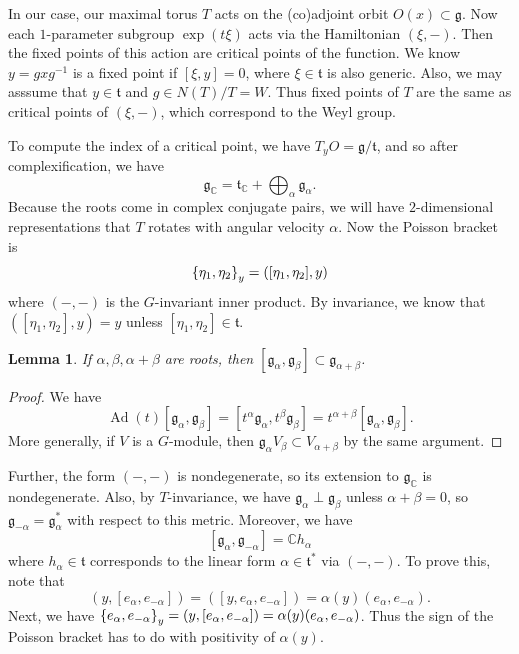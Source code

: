 \documentclass[leqno, openany]{memoir}
\newtheorem{lem}[thm]{Lemma}
\theoremstyle{definition}
\theoremstyle{remark}
\theoremstyle{plain}
\theoremstyle{definition}
\theoremstyle{remark}
\newcommand{\C}{\mathbb{C}}
\newcommand{\mf}[1]{\mathfrak{#1}}
\DeclareMathOperator{\Ad}{Ad}
\begin{document}
In our case, our maximal torus $T$ acts on the (co)adjoint orbit $O(x) \subset \mf{g}$. Now each $1$-parameter subgroup $\exp(t \xi)$ acts via the Hamiltonian $(\xi, -)$. Then the fixed points of this action are critical points of the function. We know $y = g x g^{-1}$ is a fixed point if $[\xi, y] = 0$, where $\xi \in \mf{t}$ is also generic. Also, we may asssume that $y \in \mf{t}$ and $g \in N(T)/T = W$. Thus fixed points of $T$ are the same as critical points of $(\xi, -)$, which correspond to the Weyl group.

To compute the index of a critical point, we have $T_y O = \mf{g} / \mf{t}$, and so after complexification, we have 
\[ \mf{g}_{\C} = \mf{t}_{\C} + \bigoplus_{\alpha} \mf{g}_{\alpha}. \] 
Because the roots come in complex conjugate pairs, we will have $2$-dimensional representations that $T$ rotates with angular velocity $\alpha$. Now the Poisson bracket is
\[ \qty{\eta_1, \eta_2}_y = ([\eta_1, \eta_2], y) \]
where $(-,-)$ is the $G$-invariant inner product. By invariance, we know that $([\eta_1, \eta_2], y) = y$ unless $[\eta_1, \eta_2] \in \mf{t}$.

\begin{lem}
    If $\alpha, \beta, \alpha + \beta$ are roots, then $[\mf{g}_{\alpha}, \mf{g}_{\beta}] \subset \mf{g}_{\alpha + \beta}$.
\end{lem}

\begin{proof}
    We have
    \[ \Ad(t) [\mf{g}_{\alpha}, \mf{g}_{\beta}] = [t^{\alpha }\mf{g}_{\alpha}, t^{\beta} \mf{g}_{\beta}] = t^{\alpha + \beta} [\mf{g}_{\alpha}, \mf{g}_{\beta}]. \]
    More generally, if $V$ is a $G$-module, then $\mf{g}_{\alpha} V_{\beta} \subset V_{\alpha + \beta}$ by the same argument.
\end{proof}

Further, the form $(-,-)$ is nondegenerate, so its extension to $\mf{g}_{\C}$ is nondegenerate. Also, by $T$-invariance, we have $\mf{g}_{\alpha} \perp \mf{g}_{\beta}$ unless $\alpha + \beta = 0$, so $\mf{g}_{-\alpha} = \mf{g}_{\alpha}^*$ with respect to this metric. Moreover, we have 
\[ [\mf{g}_{\alpha}, \mf{g}_{-\alpha}] = \C h_{\alpha} \]
where $h_{\alpha} \in \mf{t}$ corresponds to the linear form $\alpha \in \mf{t}^*$ via $(-,-)$. To prove this, note that
\[ (y, [e_{\alpha}, e_{-\alpha}]) = ([y, e_{\alpha}, e_{-\alpha}]) = \alpha(y) (e_{\alpha}, e_{-\alpha}). \]
Next, we have $\qty{e_{\alpha}, e_{-\alpha}}_y = (y, [e_{\alpha}, e_{-\alpha}]) = \alpha(y) (e_{\alpha}, e_{-\alpha})$. Thus the sign of the Poisson bracket has to do with positivity of $\alpha(y)$.
\end{document}
